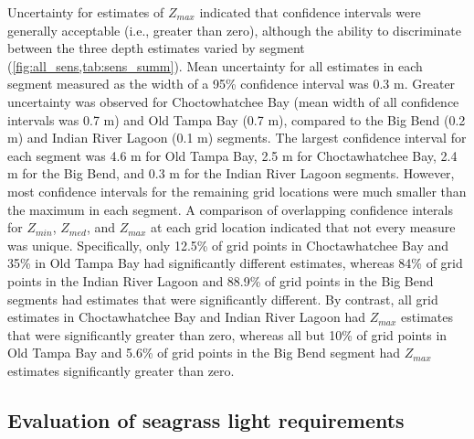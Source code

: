 \documentclass[letterpaper,12pt,oneside]{article}\usepackage[]{graphicx}\usepackage[]{color}
\begin{document}
Uncertainty for estimates of $Z_{max}$ indicated that confidence intervals were generally acceptable (i.e., greater than zero), although the ability to discriminate between the three depth estimates varied by segment (\cref{fig:all_sens,tab:sens_summ}).  Mean uncertainty for all estimates in each segment measured as the width of a 95\% confidence interval was 0.3 m.  Greater uncertainty was observed for Choctowhatchee Bay (mean width of all confidence intervals was 0.7 m) and Old Tampa Bay (0.7 m), compared to the Big Bend (0.2 m) and Indian River Lagoon (0.1 m) segments.  The largest confidence interval for each segment was 4.6 m for Old Tampa Bay, 2.5 m for Choctawhatchee Bay, 2.4 m for the Big Bend, and 0.3 m for the Indian River Lagoon segments.  However, most confidence intervals for the remaining grid locations were much smaller than the maximum in each segment.  A comparison of overlapping confidence interals for $Z_{min}$, $Z_{med}$, and $Z_{max}$ at each grid location indicated that not every measure was unique.  Specifically, only 12.5\% of grid points in Choctawhatchee Bay and 35\% in Old Tampa Bay had significantly different estimates, whereas 84\% of grid points in the Indian River Lagoon and 88.9\% of grid points in the Big Bend segments had estimates that were significantly different.  By contrast, all grid estimates in Choctawhatchee Bay and Indian River Lagoon had $Z_{max}$ estimates that were significantly greater than zero, whereas all but 10\% of grid points in Old Tampa Bay and 5.6\% of grid points in the Big Bend segment had $Z_{max}$ estimates significantly greater than zero. 

\subsection{Evaluation of seagrass light requirements}
\end{document}
